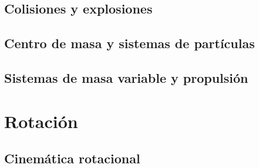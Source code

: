 ﻿\documentclass[11pt,letterpaper,openany]{book}
\newcommand{\rutaraiz}{../..}
\begin{document}




\chapter{Colisiones y explosiones}





\chapter{Centro de masa y sistemas de partículas}





\chapter{Sistemas de masa variable y propulsión}





\part{Rotación}



\chapter{Cinemática rotacional}
\end{document}
